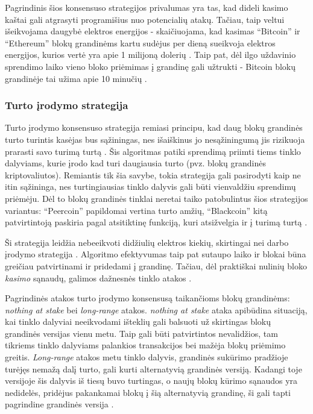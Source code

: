 Pagrindinis šios konsensuso strategijos privalumas yra tas, kad dideli kasimo kaštai gali atgrasyti programišius nuo potencialių atakų. Tačiau,
taip veltui išeikvojama daugybė elektros energijos - skaičiuojama, kad kasimas \enquote{Bitcoin} ir \enquote{Ethereum} blokų grandinėms kartu sudėjus per dieną
sueikvoja elektros energijos, kurios vertė yra apie 1 milijoną dolerių \cite{EthereumWhitePaper}. Taip pat, dėl ilgo uždavinio sprendimo laiko vieno bloko priėmimas į grandinę
gali užtrukti - Bitcoin blokų grandinėje tai užima apie 10 minučių \cite{Zheng2017}.

\subsubsection{Turto įrodymo strategija}

Turto įrodymo konsensuso strategija remiasi principu, kad daug blokų grandinės turto turintis kasėjas
bus sąžiningas, nes išaiškinus jo nesąžiningumą jis rizikuoja prarasti savo turimą turtą \cite{Baars2016}. Šis algoritmas patiki sprendimą priimti
tiems tinklo dalyviams, kurie įrodo kad turi daugiausia turto (pvz. blokų grandinės kriptovaliutos). Remiantis tik šia savybe, tokia strategija gali pasirodyti kaip ne itin sąžininga,
nes turtingiausias tinklo dalyvis gali būti vienvaldžiu sprendimų priėmėju. Dėl to blokų grandinės tinklai neretai taiko patobulintus šios strategijos
variantus: \enquote{Peercoin} papildomai vertina turto amžių, \enquote{Blackcoin} kitą patvirtintoją paskiria pagal atsitiktinę funkciją, kuri atsižvelgia ir į turimą turtą \cite{Zheng2017}.

Ši strategija leidžia nebeeikvoti didžiulių elektros kiekių, skirtingai nei darbo įrodymo strategija \cite{EthereumWhitePaper}. Algoritmo efektyvumas
taip pat sutaupo laiko ir blokai būna greičiau patvirtinami ir pridedami į grandinę. Tačiau, dėl praktiškai nulinių bloko \textit{kasimo} sąnaudų,
galimos dažnesnės tinklo atakos \cite{Zheng2017}.

Pagrindinės atakos turto įrodymo konsensusą taikančioms blokų grandinėms: \textit{nothing at stake} bei \textit{long-range} atakos. \textit{nothing at stake} ataka apibūdina situaciją,
kai tinklo dalyviai neeikvodami išteklių gali balsuoti už skirtingas blokų grandinės
versijas vienu metu. Taip gali būti patvirtintos nevalidžios, tam tikriems tinklo dalyviams palankios transakcijos bei mažėja blokų priėmimo greitis.
\textit{Long-range} atakos metu tinklo dalyvis, grandinės sukūrimo pradžioje turėjęs nemažą dalį turto, gali kurti alternatyvią grandinės versiją. Kadangi
toje versijoje šis dalyvis iš tiesų buvo turtingas, o naujų blokų kūrimo sąnaudos yra nedidelės, pridėjus pakankamai blokų į šią alternatyvią grandinę,
ši gali tapti pagrindine grandinės versija \cite{POSAttacks}.

